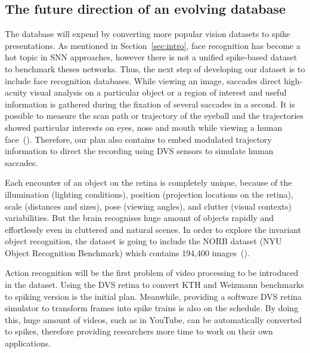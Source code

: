 \subsection{The future direction of an evolving database}
The database will expend by converting more popular vision datasets to spike presentations.
As mentioned in Section~\ref{sec:intro}, face recognition has become a hot topic in SNN approaches, however there is not a unified spike-based dataset to benchmark theses networks.
Thus, the next step of developing our dataset is to include face recognition databases.
While viewing an image,  saccades direct high-acuity visual analysis on a particular object or a region of interest and useful information is gathered during the fixation of several saccades in a second.
It is possible to measure the scan path or trajectory of the eyeball and the trajectories showed particular interests on eyes, nose and mouth while viewing a human face~(\cite{yarbus1967eye}).
Therefore, our plan also contains to embed modulated trajectory information to direct the recording using DVS sensors to simulate human saccades.


Each encounter of an object on the retina is completely unique, because of the illumination (lighting conditions), position (projection locations on the retina), scale (distances and sizes), pose (viewing angles), and clutter (visual contexts) variabilities.
But the brain recognises huge amount of objects rapidly and effortlessly even in cluttered and natural scenes.
In order to explore the invariant object recognition, the dataset is going to include the NORB dataset (NYU Object Recognition Benchmark) which contains 194,400  images~(\cite{lecun2004learning}).

Action recognition will be the first problem of video processing to be introduced in the dataset.
Using the DVS retina to convert KTH and Weizmann benchmarks to spiking version is the initial plan.
Meanwhile, providing a software DVS retina simulator to transform  frames into spike trains is also on the schedule.
By doing this, huge amount of videos, such as in YouTube, can be automatically converted to spikes, therefore providing researchers more time to work on their own applications.


